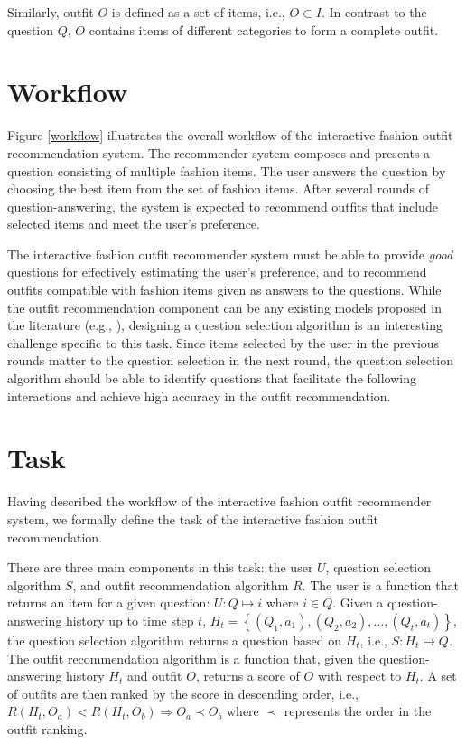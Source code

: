 Similarly, outfit $O$ is defined as a set of items, i.e., $O \subset I$. 
In contrast to the question $Q$, $O$ contains items of different categories to form a complete outfit.


\section{Workflow}

Figure \ref{workflow} illustrates the overall workflow of the interactive fashion outfit recommendation system. 
The recommender system composes and presents a question consisting of multiple fashion items.
The user answers the question by choosing the best item from the set of fashion items.
After several rounds of question-answering, the system is expected to recommend outfits 
that include selected items and meet the user's preference.

The interactive fashion outfit recommender system must be able to provide {\it good} questions
for effectively estimating the user's preference,
and to recommend outfits compatible with fashion items given as answers to the questions. 
While the outfit recommendation component can be any existing models proposed in the literature (e.g., \cite{lin2020outfitnet}),
designing a question selection algorithm is an interesting challenge specific to this task. 
Since items selected by the user in the previous rounds matter to the question selection in the next round, 
the question selection algorithm should be able to identify questions that
facilitate the following interactions and achieve high accuracy in the outfit recommendation.

\section{Task}
Having described the workflow of the interactive fashion outfit recommender system,
we formally define the task of the interactive fashion outfit recommendation.

There are three main components in this task: the user $U$, question selection algorithm $S$,
and outfit recommendation algorithm $R$.
The user is a function that returns an item for a given question:
$U: Q \mapsto i$ where $i \in Q$.
Given a question-answering history up to time step $t$, $H_t=\left\{(Q_1, a_1), (Q_2, a_2), \ldots, (Q_t, a_t)\right\}$,
the question selection algorithm returns a question based on $H_t$, i.e., $S: H_t \mapsto Q$.
The outfit recommendation algorithm is a function that,
given the question-answering history $H_t$ and outfit $O$,
returns a score of $O$ with respect to $H_t$.
A set of outfits are then ranked by the score in descending order,
i.e., $R(H_t, O_a) < R(H_t, O_b) \Rightarrow O_a \prec O_b$ 
where $\prec$ represents the order in the outfit ranking.

